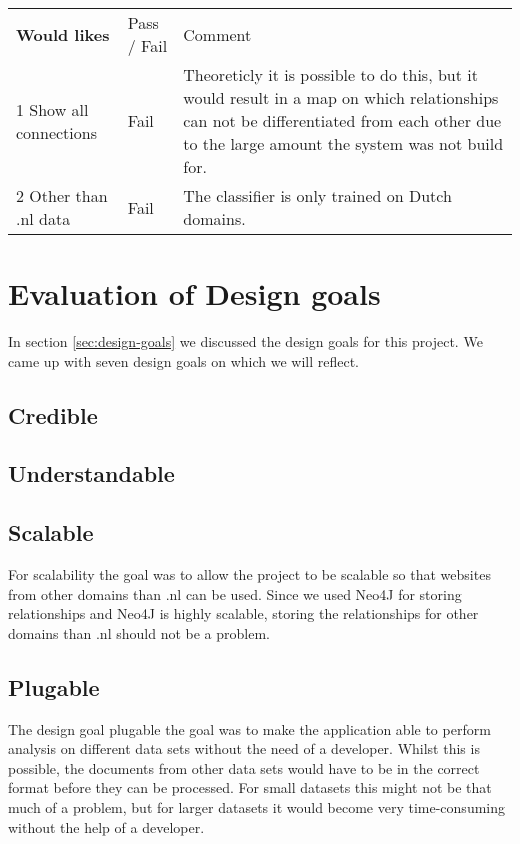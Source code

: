 \begin{table}[]
\begin{tabular}{ll m{8cm}}
\textbf{Would likes}                    & Pass / Fail & Comment                                                                                                                                                                                                                               \\
1 Show all connections         & Fail        & Theoreticly it is possible to do this, but it would result in a map on which relationships can not be differentiated from each other due to the large amount the system was not build for. \\
2 Other than .nl data          & Fail        & The classifier is only trained on Dutch domains.                                                                 
\end{tabular}
\end{table}

\section{Evaluation of Design goals}
In section \ref{sec:design-goals} we discussed the design goals for this project. We came up with seven design goals on which we will reflect.

\subsection{Credible}

\subsection{Understandable}

\subsection{Scalable}
For scalability the goal was to allow the project to be scalable so that websites from other domains than .nl can be used. Since we used Neo4J for storing relationships and Neo4J is highly scalable, storing the relationships for other domains than .nl should not be a problem. 

\subsection{Plugable}
The design goal plugable the goal was to make the application able to perform analysis on different data sets without the need of a developer. Whilst this is possible, the documents from other data sets would have to be in the correct format before they can be processed. For small datasets this might not be that much of a problem, but for larger datasets it would become very time-consuming without the help of a developer.

